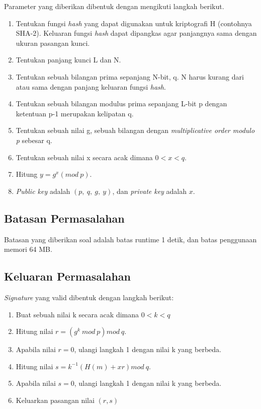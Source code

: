 Parameter yang diberikan dibentuk dengan mengikuti langkah berikut.
\begin{enumerate}
\item Tentukan fungsi \textit{hash} yang dapat digunakan untuk kriptografi H (contohnya SHA-2). Keluaran fungsi \textit{hash} dapat dipangkas agar panjangnya sama dengan ukuran pasangan kunci.
\item Tentukan panjang kunci L dan N.
\item Tentukan sebuah bilangan prima sepanjang N-bit, q. N harus kurang dari atau sama dengan panjang keluaran fungsi \textit{hash}.
\item Tentukan sebuah bilangan modulus prima sepanjang L-bit p dengan ketentuan p-1 merupakan kelipatan q.
\item Tentukan sebuah nilai g, sebuah bilangan dengan \textit{multiplicative order modulo p} sebesar q.
\item Tentukan sebuah nilai x secara acak dimana $0 < x < q$.
\item Hitung $y = g^x (mod\ p)$.
\item \textit{Public key} adalah $\left(p,\ q,\ g,\ y\right)$, dan \textit{private key} adalah $x$.
\end{enumerate}

\subsection {Batasan Permasalahan}

Batasan yang diberikan soal adalah batas runtime 1 detik, dan batas penggunaan memori 64 MB.

\subsection {Keluaran Permasalahan}

\textit{Signature} yang valid dibentuk dengan langkah berikut:
\begin{enumerate}
\item Buat sebuah nilai k secara acak dimana $0 < k < q$
\item Hitung nilai $r = \left(g^k\ mod\ p\right) mod\ q$.
\item Apabila nilai $r = 0$, ulangi langkah 1 dengan nilai k yang berbeda.
\item Hitung nilai $s = k^{-1}\left(H(m) + xr\right) mod\ q$.
\item Apabila nilai $s = 0$, ulangi langkah 1 dengan nilai k yang berbeda.
\item Keluarkan pasangan nilai $(r, s)$
\end{enumerate}

